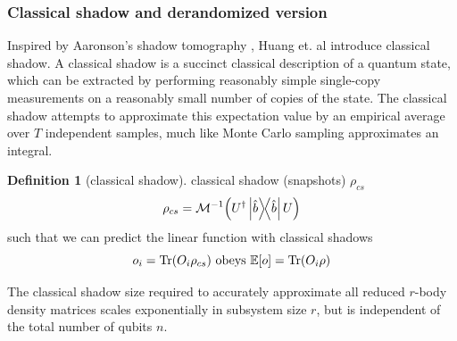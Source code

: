\documentclass[
aps,
pra,
floatfix,
]{revtex4-2}
\theoremstyle{plain}
\theoremstyle{definition}
\newtheorem{definition}{Definition}
\newtheorem{remark}{Remark}
\newcommand{\dm}{\rho}
\begin{document}
\subsubsection{Classical shadow and derandomized version}\label{sec:classical_shadow}
Inspired by Aaronson's shadow tomography \cite{aaronsonShadowTomographyQuantum2018}, Huang et. al \cite{huangPredictingManyProperties2020} introduce classical shadow.
A classical shadow is a succinct classical description of a quantum state, which can be extracted by performing reasonably simple single-copy measurements on a reasonably small number of copies of the state.
The classical shadow attempts to approximate this expectation value by an empirical average over $T$ independent samples, much like Monte Carlo sampling approximates an integral.
\begin{definition}[classical shadow]\label{def:classical_shadow}
	classical shadow (snapshots) $\dm_{cs}$
	\begin{equation}
		\dm_{cs} = \mathcal{M}^{-1} \qty(U^\dagger \op{\hat{b}} U)
	\end{equation}
	such that we can predict the linear function with classical shadows
	\begin{equation}
		o_i = \Tr(O_i \dm_{cs})
		\text{ obeys }
		\expectation[o] =\Tr(O_i \dm)
	\end{equation}
\end{definition}
The classical shadow size required to accurately approximate all reduced $r$-body density matrices scales exponentially in subsystem size $r$, but is independent of the total number of qubits $n$.
\end{document}
